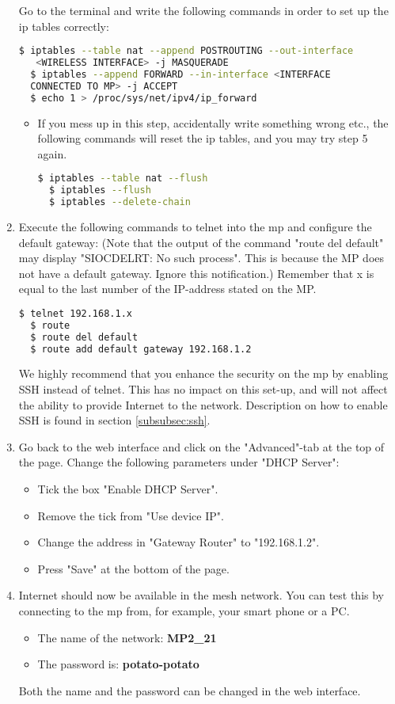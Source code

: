 \begin{enumerate}
Go to the terminal and write the following commands in order to set up the ip tables correctly:
\noindent
\begin{lstlisting}[language=bash]
  $ iptables --table nat --append POSTROUTING --out-interface
   <WIRELESS INTERFACE> -j MASQUERADE
  $ iptables --append FORWARD --in-interface <INTERFACE 
  CONNECTED TO MP> -j ACCEPT
  $ echo 1 > /proc/sys/net/ipv4/ip_forward
\end{lstlisting} 
\begin{itemize}
\item If you mess up in this step, accidentally write something wrong etc., the following commands will reset the ip tables, and you may try step 5 again.
\noindent
\begin{lstlisting}[language=bash]
  $ iptables --table nat --flush
  $ iptables --flush
  $ iptables --delete-chain
\end{lstlisting}
\end{itemize}  

\item Execute the following commands to telnet into the \gls{mp} and configure the default gateway: (Note that the output of the command "route del default" may display "SIOCDELRT: No such process". This is because the MP does not have a default gateway. Ignore this notification.) Remember that x is equal to the last number of the IP-address stated on the MP.
\begin{lstlisting}[language=bash]
  $ telnet 192.168.1.x
  $ route 
  $ route del default 
  $ route add default gateway 192.168.1.2
\end{lstlisting} 

We highly recommend that you enhance the security on the \gls{mp} by enabling SSH instead of telnet. This has no impact on this set-up, and will not affect the ability to provide Internet to the network. Description on how to enable SSH is found in section \ref{subsubsec:ssh}.

\item Go back to the web interface and click on the "Advanced"-tab at the top of the page. Change the following parameters under "DHCP Server":
\begin{itemize}
\item Tick the box "Enable DHCP Server".
\item Remove the tick from "Use device IP".
\item Change the address in "Gateway Router" to "192.168.1.2".
\item Press "Save" at the bottom of the page. 
\end{itemize}

\item Internet should now be available in the mesh network. You can test this by connecting to the \gls{mp} from, for example, your smart phone or a PC. 
\begin{itemize}
\item The name of the network: \textbf{MP2_21}
\item The password is: \textbf{potato-potato}
\end{itemize}
Both the name and the password can be changed in the web interface. 
\end{enumerate}
